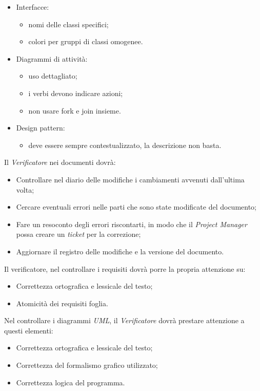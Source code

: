 \documentclass[12pt,a4paper,titlepage]{article}
\begin{document}
\begin{itemize}
\item Interfacce:
	\begin{itemize}
		\item nomi delle classi specifici;
		\item colori per gruppi di classi omogenee.
	\end{itemize}
\item Diagrammi di attività:
	\begin{itemize}
		\item uso dettagliato;
		\item i verbi devono indicare azioni;
		\item non usare fork e join insieme.
	\end{itemize}
\item Design pattern:
	\begin{itemize}
		\item deve essere sempre contestualizzato, la descrizione non basta.
	\end{itemize}
\end{itemize}
Il \textit{Verificatore} nei documenti dovrà:
\begin{itemize}
	\item Controllare nel diario delle modifiche i cambiamenti avvenuti dall'ultima volta;
	\item Cercare eventuali errori nelle parti che sono state modificate del documento;
	\item Fare un resoconto degli errori riscontarti, in modo che il \textit{Project Manager} possa creare un \textit{ticket} per la correzione;
	\item Aggiornare il registro delle modifiche e la versione del documento.
\end{itemize}
Il verificatore, nel controllare i requisiti dovrà porre la propria attenzione su:
\begin{itemize}
	\item Correttezza ortografica e lessicale del testo;
	\item Atomicità dei requisiti foglia.
\end{itemize}
Nel controllare i diagrammi \textit{UML}, il \textit{Verificatore} dovrà prestare attenzione a questi elementi:
\begin{itemize}
	\item Correttezza ortografica e lessicale del testo;
	\item Correttezza del formalismo grafico utilizzato;
	\item Correttezza logica del programma.
\end{itemize}
	
\end{document}
